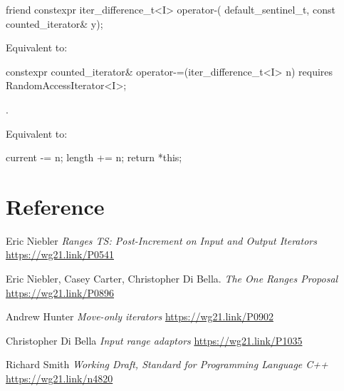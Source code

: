 \documentclass{wg21}
\begin{document}
%
\begin{itemdecl}
	friend constexpr iter_difference_t<I> operator-(
	default_sentinel_t, const counted_iterator& y);
\end{itemdecl}

\begin{itemdescr}
	\pnum
	\effects Equivalent to: 
\end{itemdescr}

%
\begin{itemdecl}
	constexpr counted_iterator& operator-=(iter_difference_t<I> n)
	requires RandomAccessIterator<I>;
\end{itemdecl}

\begin{itemdescr}
	\pnum
	\expects {}.
	
	\pnum
	\effects Equivalent to:
	\begin{codeblock}
		current -= n;
		length += n;
		return *this;
	\end{codeblock}
\end{itemdescr}

\section{Reference}
\begin{thebibliography}{9}
	
	Eric Niebler
	\emph{ Ranges TS: Post-Increment on Input and Output Iterators}\newline
	\url{https://wg21.link/P0541}
	
	Eric Niebler, Casey Carter, Christopher Di Bella.
	\emph{The One Ranges Proposal}\newline
	\url{https://wg21.link/P0896}
	
	Andrew Hunter
	\emph{Move-only iterators}\newline
	\url{https://wg21.link/P0902}

	Christopher Di Bella
	\emph{Input range adaptors}\newline
	\url{https://wg21.link/P1035}
	
	Richard Smith
	\emph{Working Draft, Standard for Programming Language C++}\newline
	\url{https://wg21.link/n4820}
	
	
\end{thebibliography}
\end{document}
